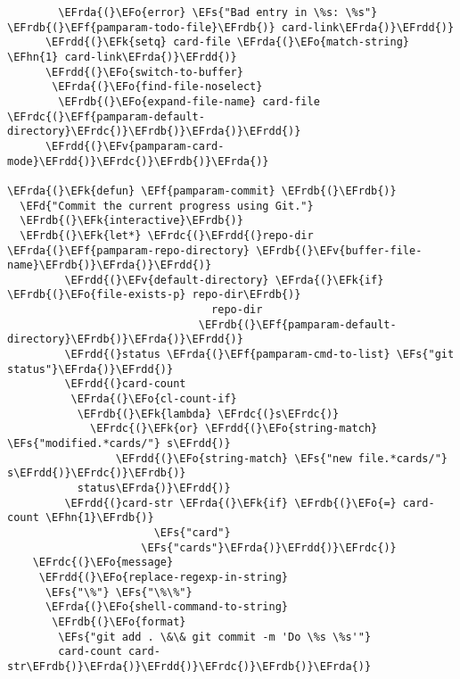 \documentclass[a4wide,10pt]{article}
\newcommand{\EFs}[1]{\textcolor{EFs}{#1}} %
\newcommand{\EFd}[1]{\textcolor{EFd}{#1}} %
\newcommand{\EFk}[1]{\textcolor{EFk}{#1}} %
\newcommand{\EFf}[1]{\textcolor{EFf}{#1}} %
\newcommand{\EFv}[1]{\textcolor{EFv}{#1}} %
\newcommand{\EFo}[1]{\textcolor{EFo}{#1}} %
\newcommand{\EFhn}[1]{\textcolor{EFhn}{\textbf{#1}}} %
\newcommand{\EFrda}[1]{\textcolor{EFrda}{#1}} %
\newcommand{\EFrdb}[1]{\textcolor{EFrdb}{#1}} %
\newcommand{\EFrdc}[1]{\textcolor{EFrdc}{#1}} %
\newcommand{\EFrdd}[1]{\textcolor{EFrdd}{#1}} %
\begin{document}
\begin{Code}
\begin{Verbatim}
        \EFrda{(}\EFo{error} \EFs{"Bad entry in \%s: \%s"} \EFrdb{(}\EFf{pamparam-todo-file}\EFrdb{)} card-link\EFrda{)}\EFrdd{)}
      \EFrdd{(}\EFk{setq} card-file \EFrda{(}\EFo{match-string} \EFhn{1} card-link\EFrda{)}\EFrdd{)}
      \EFrdd{(}\EFo{switch-to-buffer}
       \EFrda{(}\EFo{find-file-noselect}
        \EFrdb{(}\EFo{expand-file-name} card-file \EFrdc{(}\EFf{pamparam-default-directory}\EFrdc{)}\EFrdb{)}\EFrda{)}\EFrdd{)}
      \EFrdd{(}\EFv{pamparam-card-mode}\EFrdd{)}\EFrdc{)}\EFrdb{)}\EFrda{)}

\EFrda{(}\EFk{defun} \EFf{pamparam-commit} \EFrdb{(}\EFrdb{)}
  \EFd{"Commit the current progress using Git."}
  \EFrdb{(}\EFk{interactive}\EFrdb{)}
  \EFrdb{(}\EFk{let*} \EFrdc{(}\EFrdd{(}repo-dir \EFrda{(}\EFf{pamparam-repo-directory} \EFrdb{(}\EFv{buffer-file-name}\EFrdb{)}\EFrda{)}\EFrdd{)}
         \EFrdd{(}\EFv{default-directory} \EFrda{(}\EFk{if} \EFrdb{(}\EFo{file-exists-p} repo-dir\EFrdb{)}
                                repo-dir
                              \EFrdb{(}\EFf{pamparam-default-directory}\EFrdb{)}\EFrda{)}\EFrdd{)}
         \EFrdd{(}status \EFrda{(}\EFf{pamparam-cmd-to-list} \EFs{"git status"}\EFrda{)}\EFrdd{)}
         \EFrdd{(}card-count
          \EFrda{(}\EFo{cl-count-if}
           \EFrdb{(}\EFk{lambda} \EFrdc{(}s\EFrdc{)}
             \EFrdc{(}\EFk{or} \EFrdd{(}\EFo{string-match} \EFs{"modified.*cards/"} s\EFrdd{)}
                 \EFrdd{(}\EFo{string-match} \EFs{"new file.*cards/"} s\EFrdd{)}\EFrdc{)}\EFrdb{)}
           status\EFrda{)}\EFrdd{)}
         \EFrdd{(}card-str \EFrda{(}\EFk{if} \EFrdb{(}\EFo{=} card-count \EFhn{1}\EFrdb{)}
                       \EFs{"card"}
                     \EFs{"cards"}\EFrda{)}\EFrdd{)}\EFrdc{)}
    \EFrdc{(}\EFo{message}
     \EFrdd{(}\EFo{replace-regexp-in-string}
      \EFs{"\%"} \EFs{"\%\%"}
      \EFrda{(}\EFo{shell-command-to-string}
       \EFrdb{(}\EFo{format}
        \EFs{"git add . \&\& git commit -m 'Do \%s \%s'"}
        card-count card-str\EFrdb{)}\EFrda{)}\EFrdd{)}\EFrdc{)}\EFrdb{)}\EFrda{)}


\end{Verbatim}
\end{Code}
\end{document}

